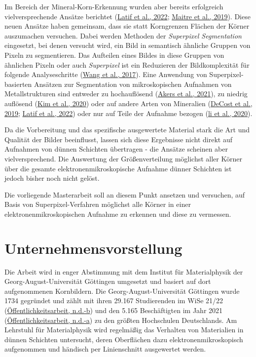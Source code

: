 \documentclass[
  12pt,
  openany]{book}
\begin{document}
Im Bereich der Mineral-Korn-Erkennung wurden aber bereits erfolgreich vielversprechende Ansätze berichtet (\protect\hyperlink{ref-latifDeepLearningBasedAutomaticMineral2022}{Latif et al., 2022}; \protect\hyperlink{ref-maitreMineralGrainsRecognition2019}{Maitre et al., 2019}). Diese neuen Ansätze haben gemeinsam, dass sie statt Korngrenzen Flächen der Körner auszumachen versuchen. Dabei werden Methoden der \emph{Superpixel Segmentation} eingesetzt, bei denen versucht wird, ein Bild in semantisch ähnliche Gruppen von Pixeln zu segmentieren. Das Aufteilen eines Bildes in diese Gruppen von ähnlichen Pixeln oder auch \emph{Superpixel} ist ein Reduzieren der Bildkomplexität für folgende Analyseschritte (\protect\hyperlink{ref-wangSuperpixelSegmentationBenchmark2017}{Wang et al., 2017}). Eine Anwendung von Superpixel-basierten Ansätzen zur Segmentation von mikroskopischen Aufnahmen von Metallstrukturen sind entweder zu hochauflösend (\protect\hyperlink{ref-akersRapidFlexibleSegmentation2021}{Akers et al., 2021}), zu niedrig auflösend (\protect\hyperlink{ref-kimUnsupervisedMicrostructureSegmentation2020}{Kim et al., 2020}) oder auf andere Arten von Mineralien (\protect\hyperlink{ref-decostHighThroughputQuantitative2019}{DeCost et al., 2019}; \protect\hyperlink{ref-latifDeepLearningBasedAutomaticMineral2022}{Latif et al., 2022}) oder nur auf Teile der Aufnahme bezogen (\protect\hyperlink{ref-liMetallographicImageSegmentation2020}{li et al., 2020}).

Da die Vorbereitung und das spezifische ausgewertete Material stark die Art und Qualität der Bilder beeinflusst, lassen sich diese Ergebnisse nicht direkt auf Aufnahmen von dünnen Schichten übertragen - die Ansätze scheinen aber vielversprechend. Die Auswertung der Größenverteilung möglichst aller Körner über die gesamte elektronenmikroskopische Aufnahme dünner Schichten ist jedoch bisher noch nicht gelöst.

Die vorliegende Masterarbeit soll an diesem Punkt ansetzen und versuchen, auf Basis von Superpixel-Verfahren möglichst alle Körner in einer elektronenmikroskopischen Aufnahme zu erkennen und diese zu vermessen.

\hypertarget{unternehmensvorstellung}{%
\section{Unternehmensvorstellung}\label{unternehmensvorstellung}}

Die Arbeit wird in enger Abstimmung mit dem Institut für Materialphysik der Georg-August-Universität Göttingen umgesetzt und basiert auf dort aufgenommenen Kornbildern.
Die Georg-August-Universität Göttingen wurde 1734 gegründet und zählt mit ihren 29.167 Studierenden im WiSe 21/22 (\protect\hyperlink{ref-offentlichkeitsarbeitStudiumUndLehre}{Öffentlichkeitsarbeit, n.d.-b}) und den 5.165 Beschäftigten im Jahr 2021 (\protect\hyperlink{ref-offentlichkeitsarbeitPersonalGeorgAugustUniversitatGottingen}{Öffentlichkeitsarbeit, n.d.-a}) zu den größten Hochschulen Deutschlands. Am Lehrstuhl für Materialphysik wird regelmäßig das Verhalten von Materialien in dünnen Schichten untersucht, deren Oberflächen dazu elektronenmikroskopisch aufgenommen und händisch per Linienschnitt ausgewertet werden.
\end{document}
